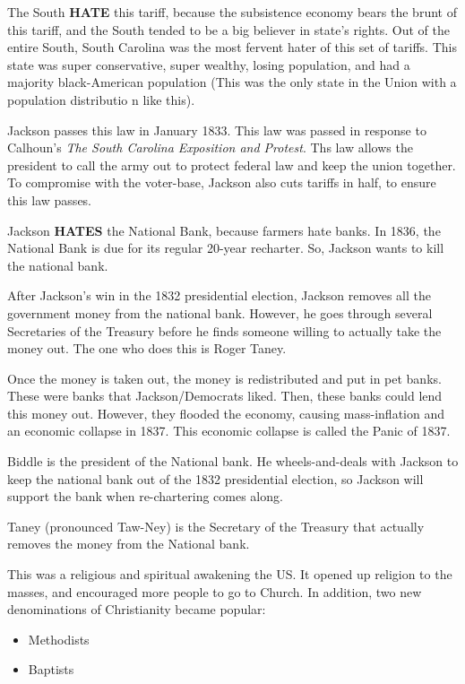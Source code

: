 \begin{description}
\begin{description}[noitemsep]
    The South \textbf{HATE} this tariff, because the subsistence economy bears the brunt of this tariff, and the South tended to be a big believer in state's rights.
    Out of the entire South, South Carolina was the most fervent hater of this set of tariffs.
    This state was super conservative, super wealthy, losing population, and had a majority black-American population (This was the only state in the Union with a population distributio n like this).

  \item[Force Act] Jackson passes this law in January 1833.
    This law was passed in response to Calhoun's \textit{The South Carolina Exposition and Protest}.
    Ths law allows the president to call the army out to protect federal law and keep the union together.
    To compromise with the voter-base, Jackson also cuts tariffs in half, to ensure this law passes.

  \item[Bank Crisis] Jackson \textbf{HATES} the National Bank, because farmers hate banks.
    In 1836, the National Bank is due for its regular 20-year recharter.
    So, Jackson wants to kill the national bank.

    After Jackson's win in the 1832 presidential election, Jackson removes all the government money from the national bank.
    However, he goes through several Secretaries of the Treasury before he finds someone willing to actually take the money out.
    The one who does this is Roger Taney.

    Once the money is taken out, the money is redistributed and put in pet banks.
    These were banks that Jackson/Democrats liked.
    Then, these banks could lend this money out.
    However, they flooded the economy, causing mass-inflation and an economic collapse in 1837.
    This economic collapse is called the Panic of 1837.

  \item[Nicholas Biddle] Biddle is the president of the National bank.
    He wheels-and-deals with Jackson to keep the national bank out of the 1832 presidential election, so Jackson will support the bank when re-chartering comes along.

  \item[Roger Taney] Taney (pronounced Taw-Ney) is the Secretary of the Treasury that actually removes the money from the National bank.
  \end{description}

\item[Second Great Awakening] This was a religious and spiritual awakening the US.\@
  It opened up religion to the masses, and encouraged more people to go to Church.
  In addition, two new denominations of Christianity became popular:
  \begin{itemize}[noitemsep]
  \item Methodists
  \item Baptists
  \end{itemize}


\end{description}

